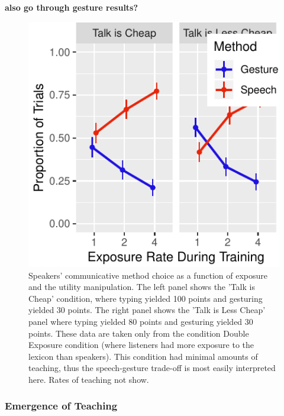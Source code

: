 \documentclass[10pt, letterpaper]{article}
\newenvironment{CodeChunk}{}{}
\begin{document}
\textbf{also go through gesture results?}

\begin{CodeChunk}
\begin{figure}[H]

{\centering \includegraphics{figs/exp_speech_gesture-1} 

}

\caption[Speakers' communicative method choice as a function of exposure and the utility manipulation]{Speakers' communicative method choice as a function of exposure and the utility manipulation. The left panel shows the 'Talk is Cheap' condition, where typing yielded 100 points and gesturing yielded 30 points. The right panel shows the 'Talk is Less Cheap' panel where typing yielded 80 points and gesturing yielded 30 points. These data are taken only from the condition Double Exposure condition (where listeners had more exposure to the lexicon than speakers). This condition had minimal amounts of teaching, thus the speech-gesture trade-off is most easily interpreted here. Rates of teaching not show.}\label{fig:exp_speech_gesture}
\end{figure}
\end{CodeChunk}

\hypertarget{emergence-of-teaching}{%
\subsubsection{Emergence of Teaching}\label{emergence-of-teaching}}
\end{document}
